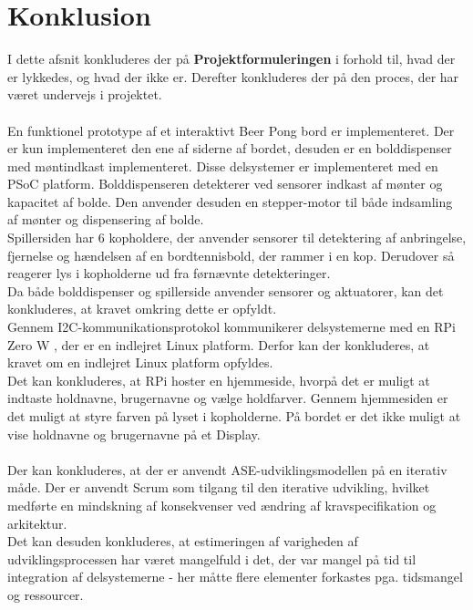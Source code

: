 \documentclass[Rapport/Rapport_main.tex]{subfiles}
\begin{document}
\section{Konklusion}
I dette afsnit konkluderes der på \textbf{Projektformuleringen} i forhold til, hvad der er lykkedes, og hvad der ikke er. Derefter konkluderes der på den proces, der har været undervejs i projektet.\\\\
En funktionel prototype af et interaktivt Beer Pong bord er implementeret. Der er kun implementeret den ene af siderne af bordet, desuden er en bolddispenser med møntindkast implementeret. Disse delsystemer er implementeret med en PSoC platform\cite{psoc5lp}. Bolddispenseren detekterer ved sensorer indkast af mønter og kapacitet af bolde. Den anvender desuden en stepper-motor til både indsamling af mønter og dispensering af bolde.\\
Spillersiden har 6 kopholdere, der anvender sensorer til detektering af anbringelse, fjernelse og hændelsen af en bordtennisbold, der rammer i en kop. Derudover så reagerer lys i kopholderne ud fra førnævnte detekteringer.\\
Da både bolddispenser og spillerside anvender sensorer og aktuatorer, kan det konkluderes, at kravet omkring dette er opfyldt. \\
Gennem I2C-kommunikationsprotokol\cite{i2c_protocol} kommunikerer delsystemerne med en RPi Zero W \cite{rpi_webpage}, der er en indlejret Linux platform. Derfor kan der konkluderes, at kravet om en indlejret Linux platform opfyldes.\\
Det kan konkluderes, at RPi hoster en hjemmeside, hvorpå det er muligt at indtaste holdnavne, brugernavne og vælge holdfarver. Gennem hjemmesiden er det muligt at styre farven på lyset i kopholderne. På bordet er det ikke muligt at vise holdnavne og brugernavne på et Display.\\\\
Der kan konkluderes, at der er anvendt ASE-udviklingsmodellen på en iterativ måde. Der er anvendt Scrum som tilgang til den iterative udvikling, hvilket medførte en mindskning af konsekvenser ved ændring af kravspecifikation og arkitektur. \\
Det kan desuden konkluderes, at estimeringen af varigheden af udviklingsprocessen har været mangelfuld i det, der var mangel på tid til integration af delsystemerne - her måtte flere elementer forkastes pga. tidsmangel og ressourcer.   
\end{document}
